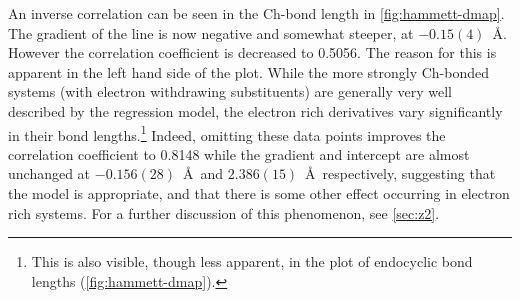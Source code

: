 \begin{refsection}
An inverse correlation can be seen in the  Ch-bond length in \cref{fig:hammett-dmap}.
The gradient of the line is now negative and somewhat steeper, at $-0.15(4)$~\AA.
However the correlation coefficient is decreased to 0.5056.
The reason for this is apparent in the left hand side of the plot.
While the more strongly Ch-bonded systems (with electron withdrawing substituents) are generally very well described by the regression model, the electron rich derivatives  vary significantly in their bond lengths.\footnote{This is also visible, though less apparent, in the plot of endocyclic bond lengths (\cref{fig:hammett-dmap}).}
Indeed, omitting these data points improves the correlation coefficient to 0.8148 while the gradient and intercept are almost unchanged at $-0.156(28)$~\AA~and $2.386(15)$~\AA~respectively, suggesting that the model is appropriate, and that there is some other effect occurring in electron rich systems.
For a further discussion of this phenomenon, see \cref{sec:z2}.


\end{refsection}
